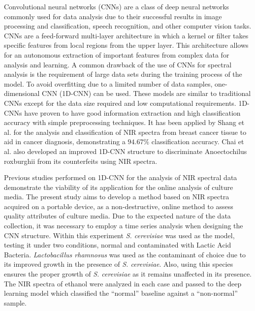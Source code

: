 \documentclass[12pt]{report}
\renewcommand{\cite}{\supercite}
\begin{document}
Convolutional neural networks (CNNs) are a class of deep neural networks commonly used for data analysis due to their successful results in image processing and classification,\cite{AnalysisConvolutionalNeuralsharma2018} speech recognition,\cite{SpeechRecognitionUsingalsobhani2021} and other computer vision tasks. CNNs are a feed-forward multi-layer architecture in which a kernel or filter takes specific features from local regions from the upper layer. This architecture allows for an autonomous extraction of important features from complex data for analysis and learning.\cite{NIRSpectroscopyCombinedshang2023} A common drawback of the use of CNNs for spectral analysis is the requirement of large data sets during the training process of the model.\cite{zhangNearInfraredSpectralCharacteristic2022} To avoid overfitting due to a limited number of data samples, one-dimensional CNN (1D-CNN) can be used. These models are similar to traditional CNNs except for the data size required and low computational requirements. 1D-CNNs have proven to have good information extraction and high classification accuracy with simple preprocessing techniques. It has been applied by Shang et al.\cite{NIRSpectroscopyCombinedshang2023} for the analysis and classification of NIR spectra from breast cancer tissue to aid in cancer diagnosis, demonstrating a $94.67\%$ classification accuracy. Chai et al.\cite{Improved1DConvolutionalchai2021} also developed an improved 1D-CNN structure to discriminate Anoectochilus roxburghii from its counterfeits using NIR spectra.

Previous studies performed on 1D-CNN for the analysis of NIR spectral data demonstrate the viability of its application for the online analysis of culture media. The present study aims to develop a method based on NIR spectra acquired on a portable device, as a non-destructive, online method to assess quality attributes of culture media. Due to the expected nature of the data collection, it was necessary to employ a time series analysis when designing the CNN structure. Within this experiment \emph{S. cerevisiae} was used as the model, testing it under two conditions, normal and contaminated with Lactic Acid Bacteria. \emph{Lactobacillus rhamnosus} was used as the contaminant of choice due to its improved growth in the presence of \emph{S. cerevisiae}. Also, using this species ensures the proper growth of \emph{S. cerevisiae} as it remains unaffected in its presence.\cite{YeastHumanCoevolutionnenciarini2024} The NIR spectra of ethanol were analyzed in each case and passed to the deep learning model which classified the “normal” baseline against a “non-normal” sample. 
\end{document}
